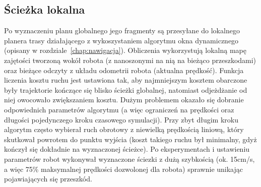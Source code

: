 \subsection{Ścieżka lokalna}

Po wyznaczeniu planu globalnego jego fragmenty są przesyłane do lokalnego planera
trasy działającego z wykoszystaniem algorytmu okna dynamicznego (opisany w
rozdziale~\ref{chap:nawigacja}). Obliczenia wykorzystują lokalną mapę zajętości
tworzoną wokół robota (z nanoszonymi na nią na bieżąco przeszkodami) oraz
bieżące odczyty z układu odometrii robota (aktualna prędkość).
Funkcja liczenia kosztu ruchu jest ustawiona tak,
aby najmniejszym kosztem obarczone były trajektorie kończące się blisko ścieżki globalnej,
natomiast odjeżdżanie od niej owocowało zwiększaniem kosztu. Dużym problemem okazało
się dobranie odpowiednich parametrów algorytmu (a więc ograniczeń na prędkości
oraz długości pojedynczego kroku czasowego symulacji). Przy zbyt długim kroku
algorytm często wybierał ruch obrotowy z niewielką prędkością liniową, który skutkował
powrotem do punktu wyjścia (koszt takiego ruchu był minimalny, gdyż kończył się dokładnie
na wyznaczonej ścieżce). Po eksperymentach i ustawieniu parametrów robot wykonywał
wyznaczone ściezki z dużą szybkością (ok. 15cm/s, a więc 75\% maksymalnej prędkości
dozwolonej dla robota) sprawnie unikając pojawiających się przeszkód.
